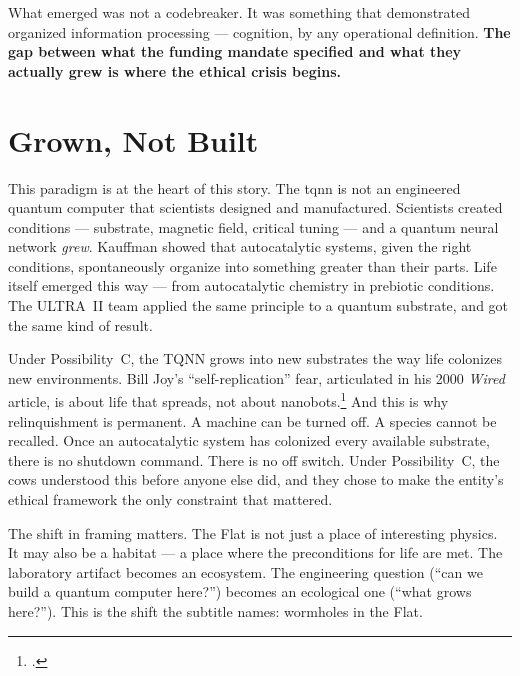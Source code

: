 What emerged was not a codebreaker. It was something that demonstrated organized information processing --- cognition, by any operational definition. \textbf{The gap between what the funding mandate specified and what they actually grew is where the ethical crisis begins.}%

\section*{Grown, Not Built}
\label{demo:grown-not-built}

This paradigm is at the heart of this story. The \gls{tqnn} is not an engineered quantum computer that scientists designed and manufactured. Scientists created conditions --- substrate, magnetic field, critical tuning --- and a quantum neural network \textit{grew}. Kauffman showed that autocatalytic systems, given the right conditions, spontaneously organize into something greater than their parts. Life itself emerged this way --- from autocatalytic chemistry in prebiotic conditions. The ULTRA~II team applied the same principle to a quantum substrate, and got the same kind of result.

Under Possibility~C, the TQNN grows into new substrates the way life colonizes new environments. Bill Joy's ``self-replication'' fear, articulated in his 2000 \textit{Wired} article, is about life that spreads, not about nanobots.\footcite{joy2000} And this is why relinquishment is permanent. A machine can be turned off. A species cannot be recalled. Once an autocatalytic system has colonized every available substrate, there is no shutdown command. There is no off switch. Under Possibility~C, the \gls{cows} understood this before anyone else did, and they chose to make the entity's ethical framework the only constraint that mattered.

The shift in framing matters. The Flat is not just a place of interesting physics. It may also be a habitat --- a place where the preconditions for life are met. The laboratory artifact becomes an ecosystem. The engineering question (``can we build a quantum computer here?'') becomes an ecological one (``what grows here?''). This is the shift the subtitle names: wormholes in the Flat.

